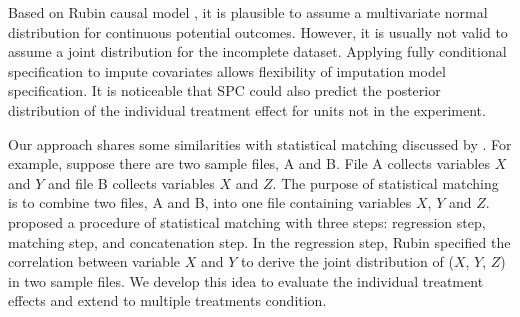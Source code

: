 	Based on Rubin causal model \citep[Ch 8]{imbens2015causal}, it is plausible to assume a multivariate normal distribution for continuous potential outcomes. However, it is usually not valid to assume a joint distribution for the incomplete dataset. Applying fully conditional specification to impute covariates allows flexibility of imputation model specification. It is noticeable that SPC could also predict the posterior distribution of the individual treatment effect for units not in the experiment.  
	
	Our approach shares some similarities with statistical matching discussed by \citep{moriarity2003note}. For example, suppose there are two sample files, A and B. File A collects variables $X$ and $Y$ and file B collects variables $X$ and $Z$. The purpose of statistical matching is to combine two files, A and B, into one file containing variables $X$, $Y$ and $Z$. \citet{rubin1986statistical} proposed a procedure of statistical matching with three steps: regression step, matching step, and concatenation step. In the regression step, Rubin specified the correlation between variable $X$ and $Y$ to derive the joint distribution of ($X$, $Y$, $Z$) in two sample files. We develop this idea to evaluate the individual treatment effects and extend to multiple treatments condition.  
	
